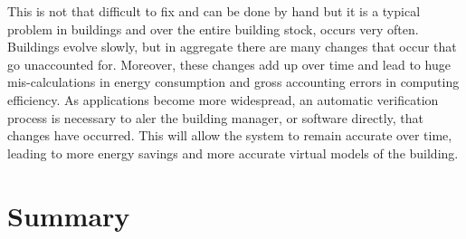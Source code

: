 This is not that difficult to fix and can be done by hand but it is a typical problem in buildings and over the entire building stock, 
occurs very often.  Buildings evolve slowly, but in aggregate there are many changes that occur that go unaccounted for.  Moreover, these
changes add up over time and lead to huge mis-calculations in energy consumption and gross accounting errors in computing efficiency.
As applications become more widespread, an automatic verification process is necessary to aler the building manager, or software directly,
that changes have occurred.  This will allow the system to remain accurate over time, leading to more energy savings and more accurate
virtual models of the building.

\section{Summary}












